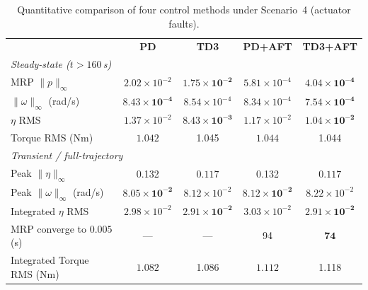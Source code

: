 \documentclass[a4paper,11pt]{article}
\begin{document}
\begin{table}[htbp]
\centering
\caption{Quantitative comparison of four control methods under Scenario~4 (actuator faults).}
\label{tab:s4}
\begin{tabular}{lcccc}
\toprule
& \textbf{PD} & \textbf{TD3} & \textbf{PD+AFT} & \textbf{TD3+AFT} \\
\cmidrule(lr){1-3} \cmidrule(lr){4-5}
\multicolumn{5}{l}{\textit{Steady-state ($t > 160$\,s)}} \\
\cmidrule(lr){1-3} \cmidrule(lr){4-5}
MRP $\|p\|_\infty$ & $2.02\times10^{-2}$ & $\mathbf{1.75\times10^{-2}}$ & $5.81\times10^{-4}$ & $\mathbf{4.04\times10^{-4}}$ \\
$\|\omega\|_\infty$ (rad/s) & $\mathbf{8.43\times10^{-4}}$ & $8.54\times10^{-4}$ & $8.34\times10^{-4}$ & $\mathbf{7.54\times10^{-4}}$ \\
$\eta$ RMS & $1.37\times10^{-2}$ & $\mathbf{8.43\times10^{-3}}$ & $1.17\times10^{-2}$ & $\mathbf{1.04\times10^{-2}}$ \\
Torque RMS (Nm) & $\mathbf{1.042}$ & 1.045 & $\mathbf{1.044}$ & 1.044 \\
\cmidrule(lr){1-3} \cmidrule(lr){4-5}
\multicolumn{5}{l}{\textit{Transient / full-trajectory}} \\
\cmidrule(lr){1-3} \cmidrule(lr){4-5}
Peak $\|\eta\|_\infty$ & 0.132 & $\mathbf{0.117}$ & 0.132 & $\mathbf{0.117}$ \\
Peak $\|\omega\|_\infty$ (rad/s) & $\mathbf{8.05\times10^{-2}}$ & $8.12\times10^{-2}$ & $\mathbf{8.12\times10^{-2}}$ & $8.22\times10^{-2}$ \\
Integrated $\eta$ RMS & $2.98\times10^{-2}$ & $\mathbf{2.91\times10^{-2}}$ & $3.03\times10^{-2}$ & $\mathbf{2.91\times10^{-2}}$ \\
MRP converge to $0.005$ (s) & --- & --- & 94 & $\mathbf{74}$ \\
Integrated Torque RMS (Nm) & $\mathbf{1.082}$ & 1.086 & $\mathbf{1.112}$ & 1.118 \\
\bottomrule
\end{tabular}
\end{table}
\end{document}
